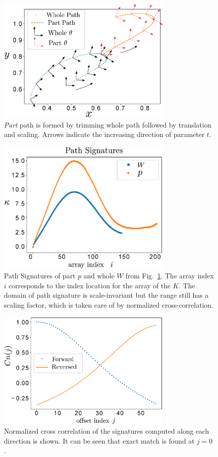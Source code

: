 \documentclass[twocolumn,10pt]{asme2e}
\begin{document}
\begin{figure}
\centering
\includegraphics[width=240pt]{figure/fig_whole_part.eps}
  \caption{\emph{Part} path is formed by trimming whole path followed by translation and scaling. Arrows indicate the increasing direction of parameter $t$.}
\label{wholePart}
\end{figure}

\begin{figure}
\centering
\includegraphics[width=240pt]{figure/fig_path_signatures.eps}
  \caption{Path Signatures of part $p$ and whole $W$ from Fig.~\ref{wholePart}. The array index $i$ corresponds to the index location for the array of the $K$. The domain of path signature is scale-invariant but the range still has a scaling factor, which is taken care of by normalized cross-correlation.}
\label{pathSignature}
\end{figure}

\begin{figure}
\centering
\includegraphics[width=240pt]{figure/fig_ncc.eps}
  \caption{Normalized cross correlation of the signatures computed along each direction is shown. It can be seen that exact match is found at $j=0$.}
\label{ncc}
\end{figure}
\end{document}
